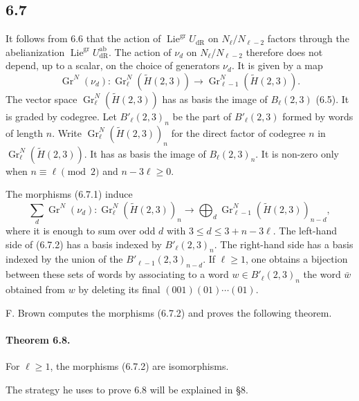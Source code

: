 \documentclass[10pt]{article}
\newcommand{\dR}{\mathrm{dR}}
\begin{document}
\subsection*{6.7}
It follows from 6.6 that the action of $\operatorname{Lie}^{\mathrm{gr}}U_{\dR}$ on $N_{\ell}/N_{\ell-2}$ factors through the abelianization $\operatorname{Lie}^{\mathrm{gr}}U^{\mathrm{ab}}_{\dR}$. The action of $\nu_d$ on $N_{\ell}/N_{\ell-2}$ therefore does not depend, up to a scalar, on the choice of generators $\nu_d$. It is given by a map
\begin{equation}
\operatorname{Gr}^{N}(\nu_d):\operatorname{Gr}^{N}_{\ell}(\widetilde H(2,3))\longrightarrow \operatorname{Gr}^{N}_{\ell-1}(\widetilde H(2,3)).
\tag{6.7.1}
\end{equation}
The vector space $\operatorname{Gr}^{N}_{\ell}(\widetilde H(2,3))$ has as basis the image of $B_{\ell}(2,3)$ (6.5). It is graded by codegree. Let $B'_{\ell}(2,3)_n$ be the part of $B'_{\ell}(2,3)$ formed by words of length $n$. Write $\operatorname{Gr}^{N}_{\ell}(\widetilde H(2,3))_n$ for the direct factor of codegree $n$ in $\operatorname{Gr}^{N}_{\ell}(\widetilde H(2,3))$. It has as basis the image of $B_{\ell}(2,3)_n$. It is non-zero only when $n\equiv\ell\pmod2$ and $n-3\ell\geq0$.

The morphisms (6.7.1) induce
\begin{equation}
\sum_d\operatorname{Gr}^{N}(\nu_d):\operatorname{Gr}^{N}_{\ell}(\widetilde H(2,3))_n\longrightarrow
\bigoplus_d\operatorname{Gr}^{N}_{\ell-1}(\widetilde H(2,3))_{n-d},
\tag{6.7.2}
\end{equation}
where it is enough to sum over odd $d$ with $3\leq d\leq3+n-3\ell$. The left-hand side of (6.7.2) has a basis indexed by $B'_{\ell}(2,3)_n$. The right-hand side has a basis indexed by the union of the $B'_{\ell-1}(2,3)_{n-d}$. If $\ell\geq1$, one obtains a bijection between these sets of words by associating to a word $w\in B'_{\ell}(2,3)_n$ the word $\bar w$ obtained from $w$ by deleting its final $(001)(01)\cdots(01)$.

F. Brown computes the morphisms (6.7.2) and proves the following theorem.

\paragraph{Theorem 6.8.}
For $\ell\geq1$, the morphisms (6.7.2) are isomorphisms.

The strategy he uses to prove 6.8 will be explained in §8.
\end{document}
